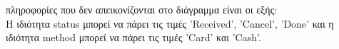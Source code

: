  πληροφορίες που δεν απεικονίζονται στο διάγραμμα είναι οι εξής: \\
Η ιδιότητα \foreignlanguage{english}{status} μπορεί να πάρει τις τιμές '\foreignlanguage{english}{Received}', '\foreignlanguage{english}{Cancel}', '\foreignlanguage{english}{Done}' και η ιδιότητα \foreignlanguage{english}{method} μπορεί να πάρει τις τιμές '\foreignlanguage{english}{Card}' και '\foreignlanguage{english}{Cash}'.
